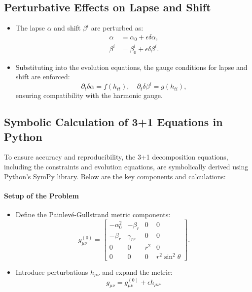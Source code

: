 \documentclass[12pt]{article}
\begin{document}
\subsection{Perturbative Effects on Lapse and Shift}
\begin{itemize}
    \item The lapse $\alpha$ and shift $\beta^i$ are perturbed as:
    \begin{align*}
        \alpha &= \alpha_0 + \epsilon \delta\alpha, \\
        \beta^i &= \beta_0^i + \epsilon \delta\beta^i.
    \end{align*}
    \item Substituting into the evolution equations, the gauge conditions for lapse and shift are enforced:
    \[
    \partial_t \delta\alpha = f(h_{tt}), \quad \partial_t \delta\beta^i = g(h_{ti}),
    \]
    ensuring compatibility with the harmonic gauge.
\end{itemize}

\subsection{Symbolic Calculation of 3+1 Equations in Python}

To ensure accuracy and reproducibility, the 3+1 decomposition equations, including the constraints and evolution equations, are symbolically derived using Python's SymPy library. Below are the key components and calculations:

\paragraph{Setup of the Problem}
\begin{itemize}
    \item Define the Painlevé-Gullstrand metric components:
    \[
    g_{\mu\nu}^{(0)} = 
    \begin{bmatrix}
    -\alpha_0^2 & -\beta_r & 0 & 0 \\
    -\beta_r & \gamma_{rr} & 0 & 0 \\
    0 & 0 & r^2 & 0 \\
    0 & 0 & 0 & r^2 \sin^2\theta
    \end{bmatrix}.
    \]
    \item Introduce perturbations $h_{\mu\nu}$ and expand the metric:
    \[
    g_{\mu\nu} = g_{\mu\nu}^{(0)} + \epsilon h_{\mu\nu}.
    \]
\end{itemize}
\end{document}
